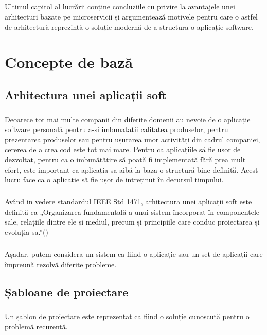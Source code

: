 \documentclass[12pt]{report}
\begin{document}
	\paragraph{}Ultimul capitol al lucrării conține concluziile cu privire la avantajele unei arhitecturi bazate pe microservicii și argumentează motivele pentru care o astfel de arhitectură reprezintă o soluție modernă de a structura o aplicație software.
\chapter{Concepte de bază} 
  \section{Arhitectura unei aplicații soft}
  	\paragraph{}
  	Deoarece tot mai multe companii din diferite domenii au nevoie de o aplicație software personală pentru a-și imbunatații calitatea produselor, pentru prezentarea produselor sau pentru ușurarea unor activități din cadrul companiei, cererea de a crea cod este tot mai mare. Pentru ca aplicațiile să fie usor de dezvoltat, pentru ca o imbunătățire să poată fi implementată fără prea mult efort, este important ca aplicația sa aibă la baza o structură bine definită. Acest lucru face ca o aplicație să fie ușor de intreținut în decursul timpului.
  	\paragraph{}Având in vedere standardul IEEE Std 1471, arhitectura unei aplicații soft este definită ca „Organizarea fundamentală a unui sistem încorporat în componentele sale, relațiile dintre ele și mediul, precum și principiile care conduc proiectarea și evoluția sa.”(\cite{hilliard2000ieee})
  	\paragraph{}Așadar, putem considera un sistem ca fiind o aplicație sau un set de aplicații care împreună rezolvă diferite probleme.
  \section{Șabloane de proiectare}
  \paragraph{}Un șablon de proiectare este reprezentat ca fiind o soluție cunoscută pentru o problemă recurentă.
\end{document}
